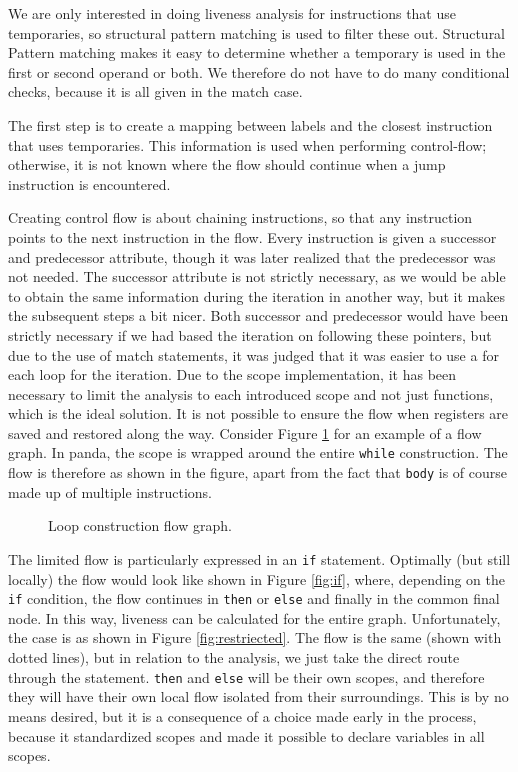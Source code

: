 We are only interested in doing liveness analysis for instructions that use temporaries, so structural pattern matching is used to filter these out. Structural Pattern matching makes it easy to determine whether a temporary is used in the first or second operand or both. We therefore do not have to do many conditional checks, because it is all given in the match case. 

The first step is to create a mapping between labels and the closest instruction that uses temporaries. This information is used when performing control-flow; otherwise, it is not known where the flow should continue when a jump instruction is encountered.

Creating control flow is about chaining instructions, so that any instruction points to the next instruction in the flow. Every instruction is given a successor and predecessor attribute, though it was later realized that the predecessor was not needed. The successor attribute is not strictly necessary, as we would be able to obtain the same information during the iteration in another way, but it makes the subsequent steps a bit nicer. Both successor and predecessor would have been strictly necessary if we had based the iteration on following these pointers, but due to the use of match statements, it was judged that it was easier to use a for each loop for the iteration. Due to the scope implementation, it has been necessary to limit the analysis to each introduced scope and not just functions, which is the ideal solution. It is not possible to ensure the flow when registers are saved and restored along the way. Consider Figure \ref{fig:flow_while} for an example of a flow graph. In panda, the scope is wrapped around the entire \texttt{while} construction. The flow is therefore as shown in the figure, apart from the fact that \texttt{body} is of course made up of multiple instructions.

\begin{figure}[H]
    \centering
    
    \caption{Loop construction flow graph.}
    \label{fig:flow_while}
\end{figure}

The limited flow is particularly expressed in an \texttt{if} statement. Optimally (but still locally) the flow would look like shown in Figure \ref{fig:if}, where, depending on the \texttt{if} condition, the flow continues in \texttt{then} or \texttt{else} and finally in the common final node. In this way, liveness can be calculated for the entire graph. Unfortunately, the case is as shown in Figure \ref{fig:restriected}. The flow is the same (shown with dotted lines), but in relation to the analysis, we just take the direct route through the statement. \texttt{then} and \texttt{else} will be their own scopes, and therefore they will have their own local flow isolated from their surroundings. This is by no means desired, but it is a consequence of a choice made early in the process, because it standardized scopes and made it possible to declare variables in all scopes.

